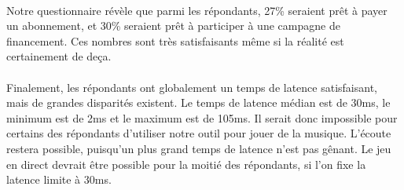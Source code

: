 \documentclass[a4,12pt]{article}
\begin{document}
\\
Notre questionnaire révèle que parmi les répondants, 27\% seraient prêt à payer un abonnement, et 30\% seraient prêt à participer à une campagne de financement. Ces nombres sont très satisfaisants même si la réalité est certainement de deça.\\
\\
Finalement, les répondants ont globalement un temps de latence satisfaisant, mais de grandes disparités existent. Le temps de latence médian est de 30ms, le minimum est de 2ms et le maximum est de 105ms.
Il serait donc impossible pour certains des répondants d’utiliser notre outil pour jouer de la musique. L’écoute restera possible, puisqu’un plus grand temps de latence n’est pas gênant.
Le jeu en direct devrait être possible pour la moitié des répondants, si l’on fixe la latence limite à 30ms.
\end{document}
